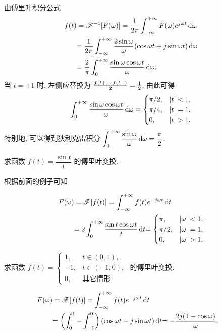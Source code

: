 \documentclass[nocolor,theme=doremi,lang=cn,11pt,chinese,twoside,openright,usesamecnt]{elegantbook}
\begin{document}
由傅里叶积分公式
\begin{align*}
	f(t)&=\mathscr{F}^{-1}[F(\omega)]=\frac1{2\pi}\int_{-\infty}^{+\infty}F(\omega)e^{j\omega t}\,\mathrm{d}\omega\\
	&{=\frac1{2\pi}\int_{-\infty}^{+\infty}\frac{2\sin\omega}{\omega}(\cos\omega t+j\sin\omega t)\,\mathrm{d} \omega}\\
	&{=\frac2\pi\int_0^{+\infty}\frac{\sin\omega\cos\omega t}{\omega}\,\mathrm{d} \omega.}
\end{align*}
当 $t=\pm1$ 时, 左侧应替换为 $\frac{f(t+)+f(t-)}2=\frac{1}{2} $.
由此可得
\[\int_0^{+\infty}\frac{\sin \omega\cos\omega t}\omega\diff\omega=\begin{cases}
	\pi/2,&|t|<1,\\
	\pi/4,&|t|=1,\\
	0,&|t|>1.
\end{cases}\]
特别地, 可以得到狄利克雷积分
$\displaystyle\int_0^{+\infty}\frac{\sin\omega}\omega\,\mathrm{d}\omega=\frac\pi2$.

\begin{example}
	求函数 $f(t)=\dfrac{\sin t}{t}$ 的傅里叶变换.
\end{example}

\begin{solution}
	根据前面的例子可知

	\begin{align*}
		F(\omega)&=\msf[f(t)]=\int_{-\infty}^{+\infty}f(t)e^{-j\omega t}\diff t\\
		&{=2\int_0^{+\infty}\frac{\sin t\cos\omega t}{t}\diff t}
		{=\begin{cases}
			\pi,&|\omega|<1,\\
			\pi/2,&|\omega|=1,\\
			0,&|\omega|>1.
			\end{cases}}
	\end{align*}
\end{solution}

\begin{example}
	求函数 $f(t)=
		\begin{cases}
			1,&t\in(0,1),\\
			-1,&t\in(-1,0),\\
			0,&\text{其它情形}
		\end{cases}$
	的傅里叶变换.
\end{example}

\begin{solution}

	\begin{align*}
		F(\omega)&=\mathscr{F}[f(t)]=\int_{-\infty}^{+\infty}f(t)e^{-j\omega t}\,\mathrm{d} t\\
		&{=\left(\int_0^1-\int_{-1}^0\right)(\cos\omega t-j\sin\omega t)\,\mathrm{d} t}
		{=-\frac{2j(1-\cos\omega)}\omega.}&{}
	\end{align*}
\end{solution}
\end{document}
